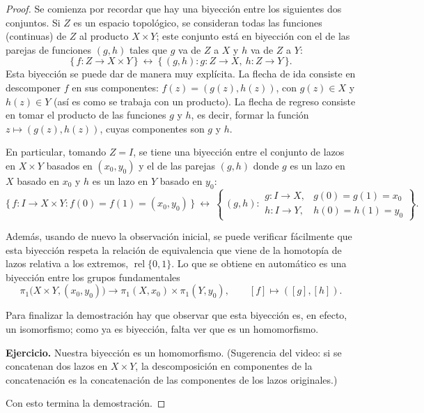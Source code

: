 \documentclass[11pt]{article}
\begin{document}
\begin{proof}
Se comienza por recordar que hay una biyección entre los siguientes dos conjuntos. Si $Z$ es un espacio topológico, se consideran todas las funciones (continuas) de $Z$ al producto $X\times Y$; este conjunto está en biyección con el de las parejas de funciones $(g,h)$ tales que $g$ va de $Z$ a $X$ y $h$ va de $Z$ a $Y$:
\[
  \{\,f\colon Z\to X\times Y\,\}\ \longleftrightarrow\ \{\,(g,h) : g\colon Z\to X,\ h\colon Z\to Y\,\}.
\]
Esta biyección se puede dar de manera muy explícita. La flecha de ida consiste en descomponer $f$ en sus componentes: $f(z)=(g(z),h(z))$, con $g(z)\in X$ y $h(z)\in Y$ (así es como se trabaja con un producto). La flecha de regreso consiste en tomar el producto de las funciones $g$ y $h$, es decir, formar la función $z\mapsto(g(z),h(z))$, cuyas componentes son $g$ y $h$.

En particular, tomando $Z=I$, se tiene una biyección entre el conjunto de lazos en $X\times Y$ basados en $(x_0,y_0)$ y el de las parejas $(g,h)$ donde $g$ es un lazo en $X$ basado en $x_0$ y $h$ es un lazo en $Y$ basado en $y_0$:
\[
  \{\,f\colon I\to X\times Y : f(0)=f(1)=(x_0,y_0)\,\}\ \longleftrightarrow\
  \left\{\,(g,h) :
  \begin{array}{ll}
    g\colon I\to X, & g(0)=g(1)=x_0\\
    h\colon I\to Y, & h(0)=h(1)=y_0
  \end{array}\right\}.
\]

Además, usando de nuevo la observación inicial, se puede verificar fácilmente que esta biyección respeta la relación de equivalencia que viene de la homotopía de lazos relativa a los extremos, $\operatorname{rel}\{0,1\}$. Lo que se obtiene en automático es una biyección entre los grupos fundamentales
\[
  \pi_1\bigl(X\times Y,(x_0,y_0)\bigr)\longrightarrow\pi_1(X,x_0)\times\pi_1(Y,y_0),\qquad [f]\longmapsto([g],[h]).
\]

Para finalizar la demostración hay que observar que esta biyección es, en efecto, un isomorfismo; como ya es biyección, falta ver que es un homomorfismo.

\medskip\noindent\textbf{Ejercicio.} Nuestra biyección es un homomorfismo. (Sugerencia del video: si se concatenan dos lazos en $X\times Y$, la descomposición en componentes de la concatenación es la concatenación de las componentes de los lazos originales.)

\medskip\noindent Con esto termina la demostración.
\end{proof}
\end{document}
